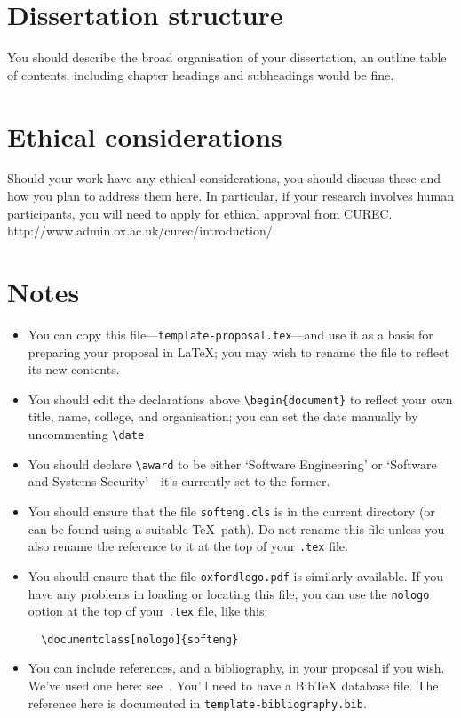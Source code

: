 \documentclass[proposal]{softeng}
\begin{document}
\section{Dissertation structure}

You should describe the broad organisation of your dissertation, an outline table of contents, including chapter headings and subheadings would be fine.

\section{Ethical considerations}

Should your work have any ethical considerations, you should discuss these and how you plan to address them here. In particular, if your research involves human participants, you will need to apply for ethical approval from CUREC. http://www.admin.ox.ac.uk/curec/introduction/




\clearpage

\section*{Notes}

\begin{itemize}\raggedright
\item You can copy this file---\verb|template-proposal.tex|---and use it
  as a basis for preparing your proposal in \LaTeX; you may wish to
  rename the file to reflect its new contents.
\item You should edit the declarations above %
  \verb|\begin{document}|%
  to reflect your own title, name, college, and organisation; you
  can set the date manually by uncommenting \verb|\date|
\item You should declare \verb|\award| to be either `Software
  Engineering' or `Software and Systems Security'---it's currently set
  to the former.
\item You should ensure that the file \verb|softeng.cls| is in
  the current directory (or can be found using a suitable \TeX\ path).
  Do not rename this file unless you also rename the reference to it
  at the top of your \verb|.tex| file.
\item You should ensure that the file \verb|oxfordlogo.pdf| is
  similarly available.  If you have any problems in loading or
  locating this file, you can use the \verb|nologo| option at the top
  of your \verb|.tex| file, like this:
\begin{verbatim}
  \documentclass[nologo]{softeng}
\end{verbatim}
\item You can include references, and a bibliography, in your proposal
  if you wish.  We've used one here: see~\cite{exampleref}.  You'll
  need to have a BibTeX database file.  The reference here is
  documented in \verb|template-bibliography.bib|.
\end{itemize}
\end{document}
